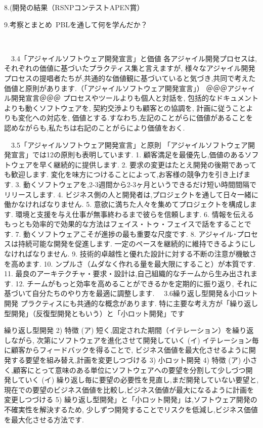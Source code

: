 \documentclass[paper]{jrsj}
\begin{document}
8.(開発の結果（RSNPコンテストAPEN賞）


9.考察とまとめ~PBLを通して何を学んだか？

 






　3.4「アジャイルソフトウェア開発宣言」と価値
各アジャイル開発プロセスは,それぞれの価値に基づいたプラクティス集と言えますが,
様々なアジャイル開発プロセスの提唱者たちが,共通的な価値観に基づいていると気づき,共同で考えた価値と原則があります.（「アジャイルソフトウェア開発宣言」）
＠＠＠アジャイル開発宣言＠＠＠
プロセスやツールよりも個人と対話を,
包括的なドキュメントよりも動くソフトウェアを,
契約交渉よりも顧客との協調を,
計画に従うことよりも変化への対応を,
価値とする.すなわち,左記のことがらに価値があることを
認めながらも,私たちは右記のことがらにより価値をおく.

　3.5「アジャイルソフトウェア開発宣言」と原則
「アジャイルソフトウェア開発宣言」では12の原則も表明しています.
1.	顧客満足を最優先し,価値のあるソフトウェアを早く継続的に提供します.
2.	要求の変更はたとえ開発の後期であっても歓迎します.
変化を味方につけることによって,お客様の競争力を引き上げます.
3.	動くソフトウェアを,2-3週間から2-3ヶ月というできるだけ短い時間間隔でリリースします.
4.	ビジネス側の人と開発者は,プロジェクトを通して日々一緒に働かなければなりません.
5.	意欲に満ちた人々を集めてプロジェクトを構成します.
環境と支援を与え仕事が無事終わるまで彼らを信頼します.
6.	情報を伝えるもっとも効率的で効果的な方法はフェイス・トゥ・フェイスで話をすることです.
7.	動くソフトウェアこそが進捗の最も重要な尺度です.
8.	アジャイル･プロセスは持続可能な開発を促進します.
一定のペースを継続的に維持できるようにしなければなりません.
9.	技術的卓越性と優れた設計に対する不断の注意が機敏さを高めます.
10.	ンプルさ（ムダなく作れる量を最大限にすること）が本質です.
11.	最良のアーキテクチャ・要求・設計は,自己組織的なチームから生み出されます.
12.	チームがもっと効率を高めることができるかを定期的に振り返り,
それに基づいて自分たちのやり方を最適に調整します.
　3.6繰り返し型開発＆小ロット開発
プラクティスにも共通的な概念があります.
特に主要な考え方が「繰り返し型開発」（反復型開発ともいう）と「小ロット開発」です

繰り返し型開発
2)	特徴
(ア)	短く,固定された期間（イテレーション）を繰り返しながら,
次第にソフトウェアを進化させて開発していく
(イ)	イテレーション毎に顧客からフィードバックを得ることで,
ビジネス価値を最大化させるように開発する要望を組み替え,計画を変更しつづける
3)	小ロット開発
4)	特徴
(ア)	小さく,顧客にとって意味のある単位にソフトウェアへの要望を分割して少しづつ開発していく
(イ)	繰り返し毎に要望の必要性を見直し,まだ開発していない要望と,現在での要望のビジネス価値を比較し,ビジネス価値が最大になるように計画を変更しつづける
5)	繰り返し型開発」と「小ロット開発」は,ソフトウェア開発の不確実性を解決するため,
少しずつ開発することでリスクを低減し,ビジネス価値を最大化させる方法です.
\end{document}
